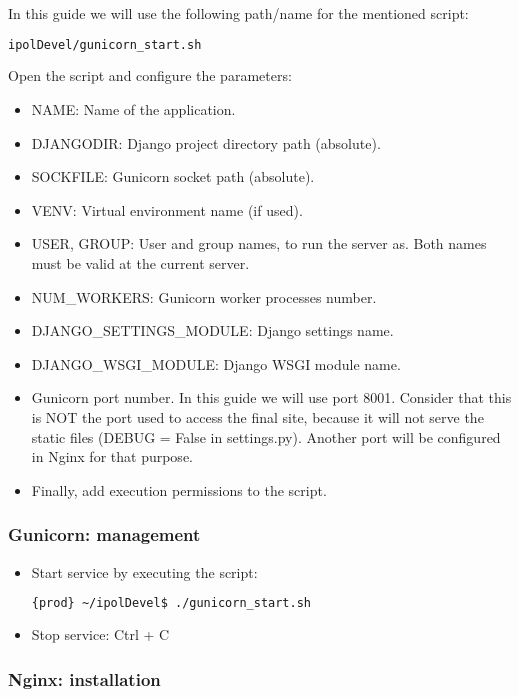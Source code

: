 In this guide we will use the following path/name for the mentioned script:
\begin{lstlisting}[language=Bash]
ipolDevel/gunicorn_start.sh
\end{lstlisting}

Open the script and configure the parameters:
\begin{itemize}
\item NAME: Name of the application.
\item DJANGODIR: Django project directory path (absolute).
\item SOCKFILE: Gunicorn socket path (absolute).
\item VENV: Virtual environment name (if used).
\item USER, GROUP: User and group names, to run the server as. Both names must be valid at the current server.
\item NUM\_WORKERS: Gunicorn worker processes number.
\item DJANGO\_SETTINGS\_MODULE: Django settings name.
\item DJANGO\_WSGI\_MODULE: Django WSGI module name.
\item Gunicorn port number. In this guide we will use port 8001. Consider that this is NOT the port used to access the final site, because it will not serve the static files (DEBUG = False in settings.py). Another port will be configured in Nginx for that purpose.
\item Finally, add execution permissions to the script.
\end{itemize}

\subsubsection{Gunicorn: management}
\begin{itemize}
\item Start service by executing the script:
\begin{lstlisting}[language=Bash]
{prod} ~/ipolDevel$ ./gunicorn_start.sh
\end{lstlisting}

\item Stop service: Ctrl + C
\end{itemize}


\subsubsection{Nginx: installation}

